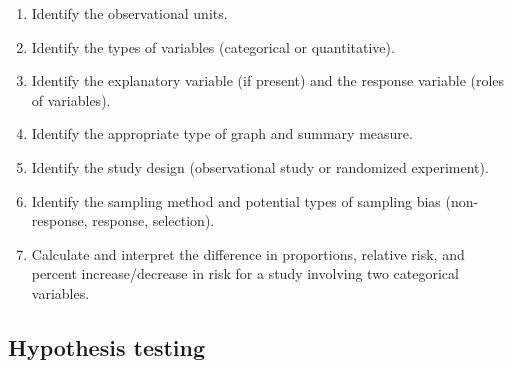 \documentclass[
]{report}
\begin{document}
\begin{enumerate}
\def\labelenumi{\arabic{enumi}.}
\item
  Identify the observational units.
\item
  Identify the types of variables (categorical or quantitative).
\item
  Identify the explanatory variable (if present) and the response variable (roles of variables).
\item
  Identify the appropriate type of graph and summary measure.
\item
  Identify the study design (observational study or randomized experiment).
\item
  Identify the sampling method and potential types of sampling bias (non-response, response, selection).
\item
  Calculate and interpret the difference in proportions, relative risk, and percent increase/decrease in risk for a study involving two categorical variables.
\end{enumerate}

\subsection*{Hypothesis testing}\label{hypothesis-testing-3}
\end{document}
